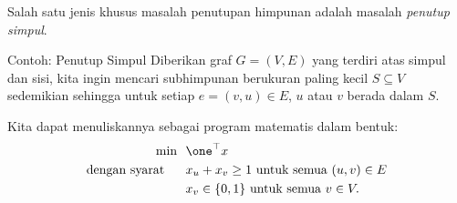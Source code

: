%
%
%
%
%
%



Salah satu jenis khusus masalah penutupan himpunan adalah masalah \emph{penutup simpul}.
\begin{general}{Contoh: Penutup Simpul}{\npcomplete}
\label{ex:vertex-cover}
Diberikan graf $G = (V,E)$ yang terdiri atas simpul dan sisi, kita ingin mencari subhimpunan berukuran paling kecil $S \subseteq V$ sedemikian sehingga untuk setiap $e = (v,u) \in E$, $u$ atau $v$ berada dalam $S$.

Kita dapat menuliskannya sebagai program matematis dalam bentuk:
\begin{equation}
\begin{split}
\min \ \ & \one^\top x\\
\st \ \ & x_u + x_v \geq 1 \text{ untuk semua } (u,v) \in E \\ 
& x_v \in \{0,1\} \text{ untuk semua } v \in V.
\end{split}
\end{equation}
\end{general}




